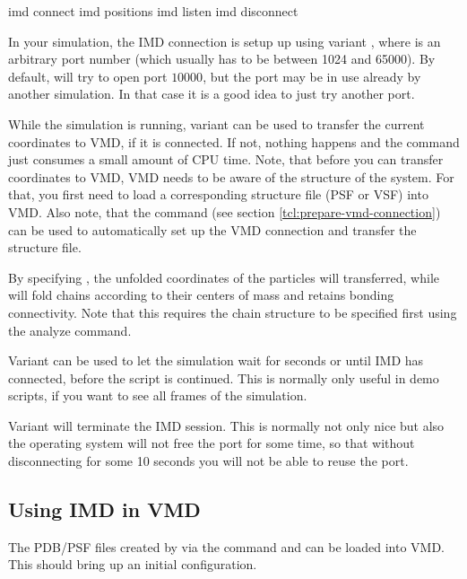 \begin{essyntax}
   imd connect 
   imd positions 
   imd listen 
   imd disconnect
\end{essyntax}

In your simulation, the IMD connection is setup up using variant
, where  is an arbitrary port number (which
usually has to be between 1024 and 65000). By default, \es will try to
open port $10000$, but the port may be in use already by another \es
simulation. In that case it is a good idea to just try another port.

While the simulation is running, variant  can be used to
transfer the current coordinates to VMD, if it is connected.  If not,
nothing happens and the command just consumes a small amount of CPU
time. Note, that before you can transfer coordinates to VMD, VMD needs
to be aware of the structure of the system. For that, you first need
to load a corresponding structure file (PSF or VSF) into VMD. Also
note, that the command  (see section
\vref{tcl:prepare-vmd-connection}) can be used to automatically set up
the VMD connection and transfer the structure file.

By specifying , the unfolded coordinates of the
particles will transferred, while  will fold chains
according to their centers of mass and retains bonding connectivity.
Note that this requires the chain structure to be specified first
using the analyze command.

Variant  can be used to let the simulation wait for
 seconds or until IMD has connected, before the script is
continued. This is normally only useful in demo scripts, if you want
to see all frames of the simulation.

Variant  will terminate the IMD session. This is normally
not only nice but also the operating system will not free the port for
some time, so that without disconnecting for some 10 seconds you will
not be able to reuse the port.

\subsection{Using IMD in VMD}

The PDB/PSF files created by \es via the command  and
 can be loaded into VMD. This should bring up an initial
configuration.

